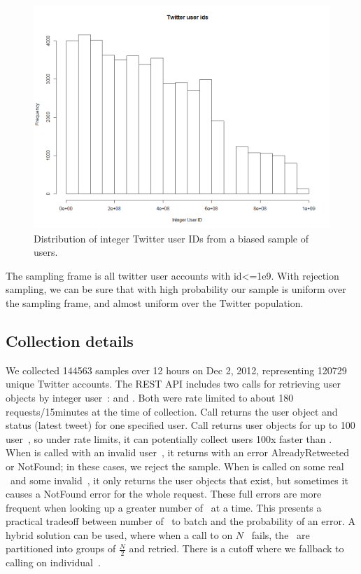 \begin{figure}[htb]
\begin{center}
  \includegraphics[width=0.8\columnwidth]{figs/user_ids_hist.png}
\end{center}
\caption{Distribution of integer Twitter user IDs from a biased sample of users.}
\label{fig:id-dist}
\end{figure}

  The sampling frame is all twitter user accounts with
 id<=1e9. With rejection sampling, we can be sure that with high
 probability our sample is uniform over the sampling frame, and almost
 uniform over the Twitter population. 
 
 \subsection{Collection details}

 We collected 144563 samples over 12 hours on Dec 2, 2012,
 representing 120729 unique Twitter accounts.  The REST API includes
 two calls for retrieving user objects by integer user~\id:
  and . Both were rate limited to
 about 180 requests/15minutes at the time of collection. Call
  returns the user object and status (latest tweet)
 for one specified user. Call  returns user objects
 for up to 100 user~\ids, so under rate limits, it can potentially
 collect users 100x faster than . When
  is called with an invalid user~\id, it returns with
 an error AlreadyRetweeted or NotFound; in these cases, we reject the
 sample. When  is called on some real \ids~and some
 invalid~\ids, it only returns the user objects that exist, but
 sometimes it causes a NotFound error for the whole request. These
 full errors are more frequent when looking up a greater number of
 \ids~at a time. This presents a practical tradeoff between number of
 \ids~to batch and the probability of an error. A hybrid solution can
 be used, where when a call to  on $N$ \ids~fails,
 the \ids~are partitioned into groups of $\frac{N}{2}$ and retried.
 There is a cutoff where we fallback to calling  on
 individual~\ids. 

